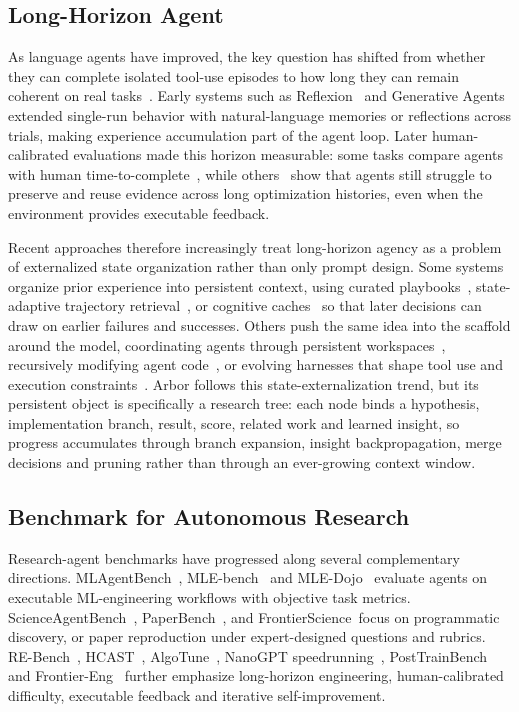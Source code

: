 \documentclass[]{selfevolagent}
\theoremstyle{plain}
\theoremstyle{definition}
\theoremstyle{remark}
\begin{document}
\subsection{Long-Horizon Agent}
As language agents have improved, the key question has shifted from whether they can complete isolated tool-use episodes to how long they can remain coherent on real tasks~\citep{longcontextsurvey,longhorizonexecution,agentfugue}. Early systems such as Reflexion~\citep{reflexion} and Generative Agents~\citep{generativeagent} extended single-run behavior with natural-language memories or reflections across trials, making experience accumulation part of the agent loop. Later human-calibrated evaluations made this horizon measurable: some tasks compare agents with human time-to-complete~\citep{rebench,hcast,metr}, while others~\citep{nanogptspeedrunning,posttrainbench} show that agents still struggle to preserve and reuse evidence across long optimization histories, even when the environment provides executable feedback.

Recent approaches therefore increasingly treat long-horizon agency as a problem of externalized state organization rather than only prompt design. Some systems organize prior experience into persistent context, using curated playbooks~\citep{ace}, state-adaptive trajectory retrieval~\citep{sam}, or cognitive caches~\citep{mlmaster2} so that later decisions can draw on earlier failures and successes. Others push the same idea into the scaffold around the model, coordinating agents through persistent workspaces~\citep{aiscientist_long}, recursively modifying agent code~\citep{darwinmachine}, or evolving harnesses that shape tool use and execution constraints~\citep{autoharness}. Arbor follows this state-externalization trend, but its persistent object is specifically a research tree: each node binds a hypothesis, implementation branch, result, score, related work and learned insight, so progress accumulates through branch expansion, insight backpropagation, merge decisions and pruning rather than through an ever-growing context window.

\subsection{Benchmark for Autonomous Research}
Research-agent benchmarks have progressed along several complementary directions. MLAgentBench~\citep{mlagentbench}, MLE-bench~\citep{mlebench} and MLE-Dojo~\citep{mledojo} evaluate agents on executable ML-engineering workflows with objective task metrics. ScienceAgentBench~\citep{scienceagentbench}, PaperBench~\citep{paperbench}, and FrontierScience~\citep{frontierscience}focus on programmatic discovery, or paper reproduction under expert-designed questions and rubrics. RE-Bench~\citep{rebench}, HCAST~\citep{hcast}, AlgoTune~\citep{algotune}, NanoGPT speedrunning~\citep{nanogptspeedrunning}, PostTrainBench~\citep{posttrainbench} and Frontier-Eng~\citep{frontiereng} further emphasize long-horizon engineering, human-calibrated difficulty, executable feedback and iterative self-improvement.
\end{document}
